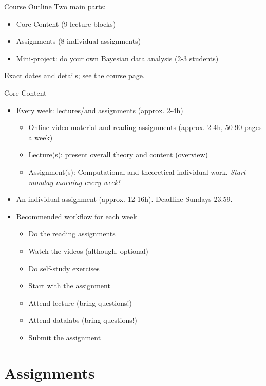 \documentclass[10pt]{beamer}
\begin{document}
\begin{frame}{Course Outline}
Two main parts:
\begin{itemize}
\item Core Content (9 lecture blocks)\pause
\item Assignments (8 individual assignments)\pause
\item Mini-project: do your own Bayesian data analysis (2-3 students)\pause
\end{itemize}
Exact dates and details; see the course page.
\end{frame}

\begin{frame}{Core Content}

\begin{itemize}
\item Every week: lectures/and assignments (approx. 2-4h)
\begin{itemize}
\item Online video material and reading assignments (approx. 2-4h, 50-90 pages a week)
\item Lecture(s): present overall theory and content (overview)
\item Assignment(s): Computational and theoretical individual work. \emph{Start monday morning every week!}
\end{itemize}
\item An individual assignment (approx. 12-16h). Deadline Sundays 23.59.\pause
\item Recommended workflow for each week
\begin{itemize}
\item Do the reading assignments
\item Watch the videos (although, optional)
\item Do self-study exercises
\item Start with the assignment
\item Attend lecture (bring questions!)
\item Attend datalabs (bring questions!)
\item Submit the assignment
\end{itemize}
\end{itemize}

\end{frame}

\section{Assignments}
\frame{\sectionpage}
\end{document}
